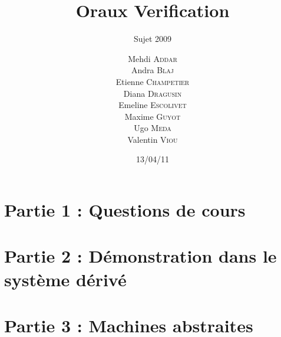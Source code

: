 \documentclass{beamer}
\title{Oraux Verification}
\subtitle{Sujet 2009}
\author[ADDAR \and BLAJ \and CHAMPETIER \and DRAGUSIN \and ESCOLIVET \and GUYOT \and MEDA \and VIOU]{ 
					Mehdi \textsc{Addar} \\
					Andra \textsc{Blaj} \\
					Etienne \textsc{Champetier} \\
					Diana \textsc{Dragusin} \\
					Emeline \textsc{Escolivet} \\
					Maxime \textsc{Guyot} \\
					Ugo \textsc{Meda} \\
					Valentin \textsc{Viou}}
\institute{}
\date{13/04/11}
\begin{document}
\begin{frame}
\titlepage
\end{frame}

\section{Partie 1 : Questions de cours}


\section{Partie 2 : Démonstration dans le système dérivé}


\section{Partie 3 : Machines abstraites}

\end{document}
